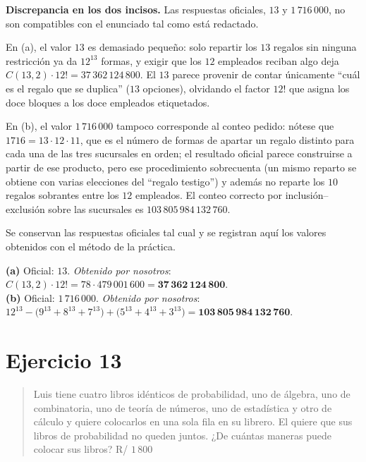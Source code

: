 \documentclass[11pt]{article}
\begin{document}
\begin{nota}
\textbf{Discrepancia en los dos incisos.} Las respuestas oficiales, $13$ y $1\,716\,000$, no son compatibles con el enunciado tal como está redactado.

En (a), el valor $13$ es demasiado pequeño: solo repartir los $13$ regalos sin ninguna restricción ya da $12^{13}$ formas, y exigir que los $12$ empleados reciban algo deja $C(13,2)\cdot 12!=37\,362\,124\,800$. El $13$ parece provenir de contar únicamente ``cuál es el regalo que se duplica'' ($13$ opciones), olvidando el factor $12!$ que asigna los doce bloques a los doce empleados etiquetados.

En (b), el valor $1\,716\,000$ tampoco corresponde al conteo pedido: nótese que $1716=13\cdot12\cdot11$, que es el número de formas de apartar un regalo distinto para cada una de las tres sucursales en orden; el resultado oficial parece construirse a partir de ese producto, pero ese procedimiento sobrecuenta (un mismo reparto se obtiene con varias elecciones del ``regalo testigo'') y además no reparte los $10$ regalos sobrantes entre los $12$ empleados. El conteo correcto por inclusión--exclusión sobre las sucursales es $103\,805\,984\,132\,760$.

Se conservan las respuestas oficiales tal cual y se registran aquí los valores obtenidos con el método de la práctica.
\end{nota}

\begin{resp}
\textbf{(a)} Oficial: $13$. \emph{Obtenido por nosotros}: $C(13,2)\cdot 12!=78\cdot 479\,001\,600=\mathbf{37\,362\,124\,800}$.\\
\textbf{(b)} Oficial: $1\,716\,000$. \emph{Obtenido por nosotros}:
$12^{13}-\bigl(9^{13}+8^{13}+7^{13}\bigr)+\bigl(5^{13}+4^{13}+3^{13}\bigr)=\mathbf{103\,805\,984\,132\,760}$.
\end{resp}

\section*{Ejercicio 13}

\begin{quote}
Luis tiene cuatro libros idénticos de probabilidad, uno de álgebra, uno de combinatoria, uno de teoría de números, uno de estadística y otro de cálculo y quiere colocarlos en una sola fila en su librero. El quiere que sus libros de probabilidad no queden juntos. ¿De cuántas maneras puede colocar sus libros? \hfill R/ $1\,800$
\end{quote}
\end{document}
